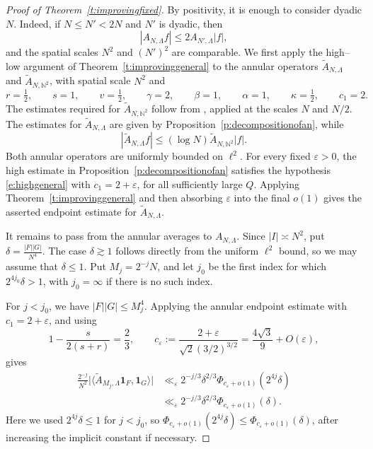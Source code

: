 \documentclass[12pt,reqno]{amsart}
\numberwithin{equation}{section}
\theoremstyle{definition}
\theoremstyle{remark}
\begin{document}
\begin{proof}[Proof of Theorem~\ref{t:improvingfixed}]
By positivity, it is enough to consider dyadic $N$.  Indeed, if
$N\leq N'<2N$ and $N'$ is dyadic, then
\[
 |A_{N,\Lambda}f|
 \leq 2A_{N',\Lambda}|f|,
\]
and the spatial scales $N^2$ and $(N')^2$ are comparable.
We first apply the high--low argument of
Theorem~\ref{t:improvinggeneral} to the annular operators
$\widetilde A_{N,\Lambda}$ and
$\widetilde A_{N,\mathbb N^2}$, with spatial scale $N^2$ and
\[
 r=\tfrac12,\qquad s=1,\qquad v=\tfrac12,\qquad
 \gamma=2,\qquad\beta=1,\qquad
 \alpha=1,\qquad\kappa=\tfrac12,\qquad c_1=2.
\]
The estimates required for \(\widetilde A_{N,\mathbb N^2}\) follow from
\cite[Lemma~2.2 and (2.5)]{LHF}, applied at the scales \(N\) and \(N/2\).
The estimates for \(\widetilde A_{N,\Lambda}\) are given by
Proposition~\ref{p:decompositionofan}, while
\[
 |\widetilde A_{N,\Lambda}f|
 \leq(\log N)\widetilde A_{N,\mathbb N^2}|f|.
\]
Both annular operators are uniformly bounded on \(\ell^2\).  For every
fixed \(\varepsilon>0\), the high estimate in
Proposition~\ref{p:decompositionofan} satisfies the hypothesis
\eqref{e:highgeneral} with \(c_1=2+\varepsilon\), for all sufficiently
large \(Q\).  Applying Theorem~\ref{t:improvinggeneral} and then absorbing
\(\varepsilon\) into the final \(o(1)\) gives the asserted endpoint estimate
for \(\widetilde A_{N,\Lambda}\).

It remains to pass from the annular averages to $A_{N,\Lambda}$.
Since $|I|\asymp N^2$, put $ \delta=\frac{|F||G|}{N^4}.$
The case $\delta\gtrsim1$ follows directly from the uniform $\ell^2$
bound, so we may assume that $\delta\leq1$.  Put
$M_j=2^{-j}N$, and let $j_0$ be the first index for which
$2^{4j_0}\delta>1$, with $j_0=\infty$ if there is no such index.

For \(j<j_0\), we have \(|F||G|\leq M_j^4\).  Applying the annular
endpoint estimate with \(c_1=2+\varepsilon\), and using
\[
 1-\frac{s}{2(s+r)}=\frac23,\qquad
 c_\varepsilon
 :=\frac{2+\varepsilon}{\sqrt2(3/2)^{3/2}}
 =\frac{4\sqrt3}{9}+O(\varepsilon),
\]
gives
\begin{align*}
 \frac{2^{-j}}{N^2}
 \bigl|\langle\widetilde A_{M_j,\Lambda}
 \mathbf1_F,\mathbf1_G\rangle\bigr|
 &\ll_\varepsilon
 2^{-j/3}\delta^{2/3}
 \Phi_{c_\varepsilon+o(1)}(2^{4j}\delta)\\
 &\ll_\varepsilon
 2^{-j/3}\delta^{2/3}
 \Phi_{c_\varepsilon+o(1)}(\delta).
\end{align*}
Here we used \(2^{4j}\delta\leq1\) for \(j<j_0\), so
\(\Phi_{c_\varepsilon+o(1)}(2^{4j}\delta)\leq
\Phi_{c_\varepsilon+o(1)}(\delta)\), after increasing the implicit
constant if necessary.


\end{proof}
\end{document}
